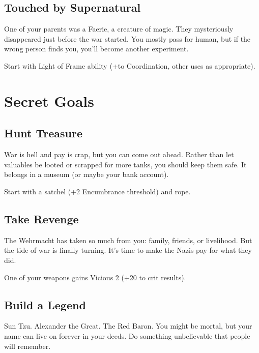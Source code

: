 \documentclass{book}
\newcommand{\bbb}{\BoostDie }
\begin{document}
\begin{multicols}{2}
\subsection{Touched by Supernatural}

One of your parents was a Faerie, a creature of magic.  They mysteriously disappeared just before the war started.  You mostly pass for human, but if the wrong person finds you, you'll become another experiment.

Start with Light of Frame ability (+\bbb to Coordination, other uses as appropriate).

\section{Secret Goals}

\subsection{Hunt Treasure}

War is hell and pay is crap, but you can come out ahead.  Rather than let valuables be looted or scrapped for more tanks, you should keep them safe.  It belongs in a museum (or maybe your bank account).

Start with a satchel (+2 Encumbrance threshold) and rope.


\subsection{Take Revenge}

The Wehrmacht has taken so much from you: family, friends, or livelihood.  But the tide of war is finally turning.  It's time to make the Nazis pay for what they did.

One of your weapons gains Vicious 2 (+20 to crit results).

\subsection{Build a Legend}

Sun Tzu.  Alexander the Great.  The Red Baron.  You might be mortal, but your name can live on forever in your deeds.  Do something unbelievable that people will remember.


\end{multicols}
\end{document}
